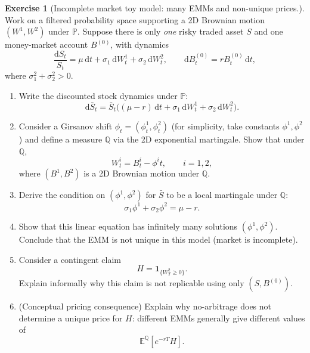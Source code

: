 \documentclass[11pt]{article}
\newcommand{\E}{\mathbb{E}}
\newcommand{\1}{\mathbf{1}}
\theoremstyle{definition}
\newtheorem{exercise}{Exercise}[section]
\begin{document}
\begin{exercise}[Incomplete market toy model: many EMMs and non-unique prices.]
Work on a filtered probability space supporting a 2D Brownian motion $(W^1,W^2)$ under $\mathbb{P}$.
Suppose there is only \emph{one} risky traded asset $S$ and one money-market account $B^{(0)}$, with dynamics
$$
\frac{\mathrm{d}S_t}{S_t}=\mu\,\mathrm{d}t+\sigma_1\,\mathrm{d}W_t^1+\sigma_2\,\mathrm{d}W_t^2,
\qquad
\mathrm{d}B_t^{(0)}=rB_t^{(0)}\,\mathrm{d}t,
$$
where $\sigma_1^2+\sigma_2^2>0$.

\begin{enumerate}[leftmargin=1.2em, label=(\alph*), itemsep=0.3em]
\item Write the discounted stock dynamics under $\mathbb{P}$:
$$
\mathrm{d}\bar S_t = \bar S_t\big((\mu-r)\,\mathrm{d}t+\sigma_1\,\mathrm{d}W_t^1+\sigma_2\,\mathrm{d}W_t^2\big).
$$

\item Consider a Girsanov shift $\phi_t=(\phi_t^1,\phi_t^2)$ (for simplicity, take constants $\phi^1,\phi^2$) and define
a measure $\mathbb{Q}$ via the 2D exponential martingale. Show that under $\mathbb{Q}$,
$$
W_t^i = B_t^i - \phi^i t,\qquad i=1,2,
$$
where $(B^1,B^2)$ is a 2D Brownian motion under $\mathbb{Q}$.

\item Derive the condition on $(\phi^1,\phi^2)$ for $\bar S$ to be a local martingale under $\mathbb{Q}$:
$$
\sigma_1\phi^1+\sigma_2\phi^2=\mu-r.
$$

\item Show that this linear equation has infinitely many solutions $(\phi^1,\phi^2)$.
Conclude that the EMM is not unique in this model (market is incomplete).

\item Consider a contingent claim
$$
H=\mathbf{1}_{\{W_T^2\ge 0\}}.
$$
Explain informally why this claim is not replicable using only $(S,B^{(0)})$.

\item (Conceptual pricing consequence) Explain why no-arbitrage does not determine a unique price for $H$:
different EMMs generally give different values of
$$
\E^\mathbb{Q}[e^{-rT}H].
$$
\end{enumerate}
\end{exercise}

\end{document}
